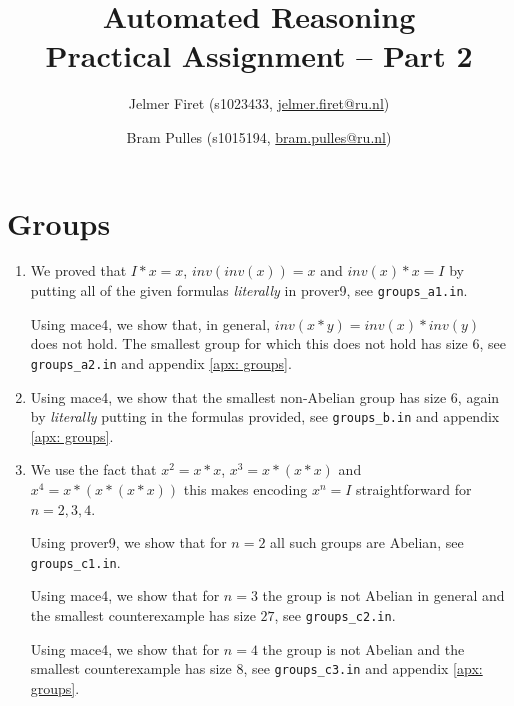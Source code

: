 \documentclass{scrartcl}
\author{Jelmer Firet (s1023433, \href{mailto:jelmer.firet@ru.nl}{jelmer.firet@ru.nl}) \and
Bram Pulles (s1015194, \href{mailto:bram.pulles@ru.nl}{bram.pulles@ru.nl})}
\title{\textbf{Automated Reasoning\\Practical Assignment -- Part 2}}
\begin{document}
\maketitle

\section{Groups} %
\label{sec:groups}
\begin{enumerate}[label=\alph*)]
\item
	We proved that $I*x=x$, $inv(inv(x))=x$ and $inv(x)*x=I$ by putting all of
	the given formulas \textit{literally} in prover9, see
	\texttt{groups\_a1.in}.

	Using mace4, we show that, in general, $inv(x*y)=inv(x)*inv(y)$ does not
	hold. The smallest group for which this does not hold has size $6$, see
	\texttt{groups\_a2.in} and appendix \ref{apx: groups}.
\item
	Using mace4, we show that the smallest non-Abelian group has size $6$,
	again by \textit{literally} putting in the formulas provided, see
	\texttt{groups\_b.in} and appendix \ref{apx: groups}.
\item
	We use the fact that $x^2 = x * x$, $x^3 = x * (x * x)$ and $x^4 = x * (x *
	(x * x))$ this makes encoding $x^n = I$ straightforward for $n = 2, 3, 4$.

	Using prover9, we show that for $n=2$ all such groups are Abelian, see \texttt{groups\_c1.in}.

	Using mace4, we show that for $n=3$ the group is not Abelian in general and
	the smallest counterexample has size $27$, see \texttt{groups\_c2.in}.

	Using mace4, we show that for $n=4$ the group is not Abelian and the
	smallest counterexample has size $8$, see \texttt{groups\_c3.in} and
	appendix \ref{apx: groups}.
\end{enumerate}

\appendix
\pagebreak
\end{document}
